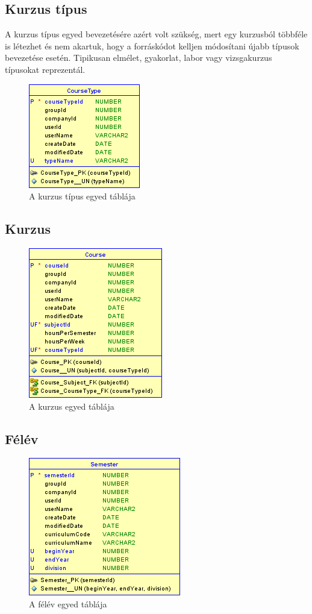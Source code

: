 \documentclass[hidelinks, 12pt, a4paper]{report}
\begin{document}
\subsection{Kurzus típus}

A kurzus típus egyed bevezetésére azért volt szükség, mert egy kurzusból többféle is létezhet és nem akartuk, hogy a forráskódot kelljen módosítani újabb típusok bevezetése esetén. Tipikusan elmélet, gyakorlat, labor vagy vizsgakurzus típusokat reprezentál.

\begin{figure}[H]
    \centering
	\includegraphics{course_type.png}
	\caption{A kurzus típus egyed táblája}
\end{figure}

\subsection{Kurzus}

\begin{figure}[H]
    \centering
	\includegraphics{course.png}
	\caption{A kurzus egyed táblája}
\end{figure}

\subsection{Félév}

\begin{figure}[H]
    \centering
	\includegraphics{semester.png}
	\caption{A félév egyed táblája}
\end{figure}
\end{document}
